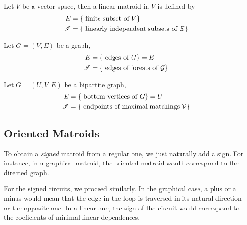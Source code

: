\begin{definition}
    Let $V$ be a vector space, then a linear matroid in $V$ is defined by
    \begin{equation*}
        \begin{split}
            E & = \lbrace \text{ finite subset of } V \rbrace \\
            \mathscr{I} & = \lbrace \text{ linearly independent subsets of } E \rbrace
        \end{split}
    \end{equation*}
\end{definition}

\begin{definition}
    Let $G = (V, E)$ be a graph,
    \begin{equation*}
        \begin{split}
            E & = \lbrace \text{ edges of } G \rbrace = E \\
            \mathscr{I} & = \lbrace \text{ edges of forests of } \mathcal{G} \rbrace
        \end{split}
    \end{equation*}
\end{definition}

\begin{definition}
    Let $G = (U, V, E)$ be a bipartite graph,
    \begin{equation*}
        \begin{split}
            E & = \lbrace \text{ bottom vertices of } G \rbrace = U \\
            \mathscr{I} & = \lbrace \text{ endpoints of maximal matchings } \mathcal{V} \rbrace
        \end{split}
    \end{equation*}
\end{definition}

\subsection{Oriented Matroids}

To obtain a \textit{signed} matroid from a regular one, we just naturally add a sign.
For instance, in a graphical matroid, the oriented matroid would correspond to the directed graph.

For the signed circuits, we proceed similarly.
In the graphical case, a plus or a minus would mean that the edge in the loop is traversed in its natural direction or the opposite one.
In a linear one, the sign of the circuit would correspond to the coeficients of minimal linear dependences.

